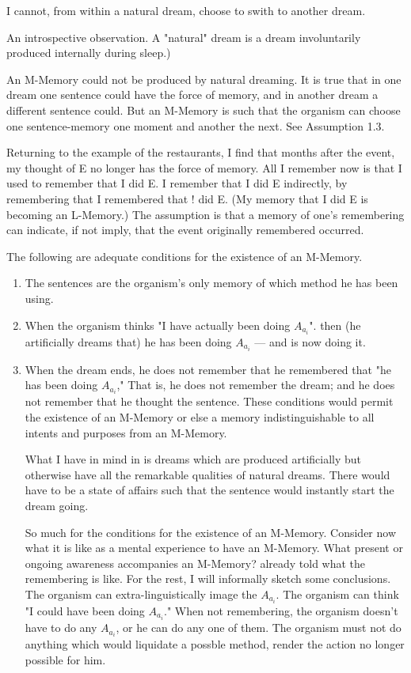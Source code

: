 \documentclass[10pt,twoside]{memoir}
\begin{document}
\begin{enumerate}
{\begin{enumerate}
\begin{sysrules}
\begin{sysrules}
\begin{sysrules}
\begin{sysrules}
 I cannot, from within a natural dream, choose to swith 
to another dream. {An introspective observation. A "natural" dream is a 
dream involuntarily produced internally during sleep.) 

 An M-Memory could not be produced by natural 
dreaming. It is true that in one dream one sentence could have the force of 
memory, and in another dream a different sentence could. But an M-Memory 
is such that the organism can choose one sentence-memory one moment and 
another the next. See Assumption 1.3. 

 Returning to the example of the restaurants, I find 
that months after the event, my thought of E no longer has the force of 
memory. All I remember now is that I used to remember that I did E. I 
remember that I did E indirectly, by remembering that I remembered that ! 
did E. (My memory that I did E is becoming an L-Memory.) The assumption 
is that a memory of one's remembering can indicate, if not imply, that the 
event originally remembered occurred. 

 The following are adequate conditions for the existence 
of an M-Memory. 
\begin{enumerate}
\item The sentences are the organism's only memory of which 
method he has been using. 

\item When the organism thinks "I have actually been doing $A_{a_i}$".
then (he artificially dreams that) he has been doing $A_{a_i}$ --- and is 
now doing it. 

\item When the dream ends, he does not remember that he 
remembered that "he has been doing $A_{a_i}$," That is, he does not remember 
the dream; and he does not remember that he thought the sentence. These 
conditions would permit the existence of an M-Memory or else a memory 
indistinguishable to all intents and purposes from an M-Memory. 

What I have in mind in  is dreams which are produced 
artificially but otherwise have all the remarkable qualities of natural dreams. 
There would have to be a state of affairs such that the sentence would 
instantly start the dream going. 

So much for the conditions for the existence of an M-Memory. 
Consider now what it is like as a mental experience to have an M-Memory. 
What present or ongoing awareness accompanies an M-Memory? 
 already told what the remembering is like. For the rest, I will 
informally sketch some conclusions. The organism can extra-linguistically 
image the $A_{a_i}$. The organism can think "I could have been doing $A_{a_i}$." When 
not remembering, the organism doesn't have to do any $A_{a_i}$, or he can do any 
one of them. The organism must not do anything which would liquidate a 
possble method, render the action no longer possible for him. 


\end{enumerate}}
\end{sysrules}
\end{sysrules}
\end{sysrules}
\end{sysrules}
\end{enumerate}}
\end{enumerate}
\end{document}
